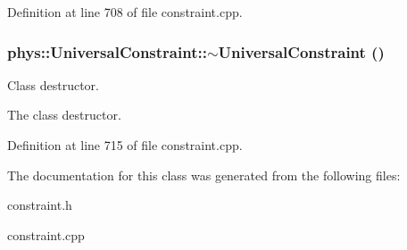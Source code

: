 Definition at line 708 of file constraint.cpp.

\hypertarget{classphys_1_1UniversalConstraint_aba3078f0f19a1a66c330d96f278e6fd8}{
\subsubsection[{$\sim$UniversalConstraint}]{\setlength{\rightskip}{0pt plus 5cm}phys::UniversalConstraint::$\sim$UniversalConstraint ()}}
\label{d0/d09/classphys_1_1UniversalConstraint_aba3078f0f19a1a66c330d96f278e6fd8}


Class destructor. 

The class destructor. 

Definition at line 715 of file constraint.cpp.



The documentation for this class was generated from the following files:\begin{DoxyCompactItemize}
\item 
constraint.h\item 
constraint.cpp\end{DoxyCompactItemize}

